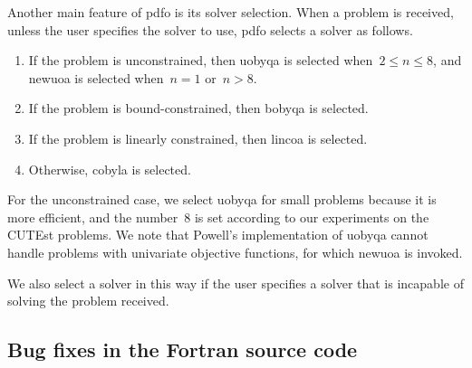 Another main feature of \gls{pdfo} is its solver selection.
When a problem is received, unless the user specifies the solver to use, \gls{pdfo} selects a solver as follows.
\begin{enumerate}
    \item If the problem is unconstrained, then \gls{uobyqa} is selected when~$2 \le n \le 8$, and \gls{newuoa} is selected when~$n = 1$ or~$n > 8$.
    \item If the problem is bound-constrained, then \gls{bobyqa} is selected.
    \item If the problem is linearly constrained, then \gls{lincoa} is selected.
    \item Otherwise, \gls{cobyla} is selected.
\end{enumerate}

For the unconstrained case, we select \gls{uobyqa} for small problems because it is more efficient, and the number~$8$ is set according to our experiments on the CUTEst problems.
We note that Powell's implementation of \gls{uobyqa} cannot handle problems with univariate objective functions, for which \gls{newuoa} is invoked.

We also select a solver in this way if the user specifies a solver that is incapable of solving the problem received.

\subsection{Bug fixes in the Fortran source code}
\label{subsec:bug-corrections}

